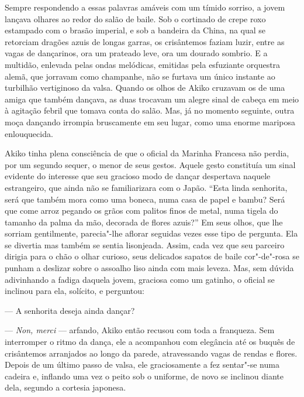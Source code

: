 Sempre respondendo a essas palavras amáveis com um tímido sorriso, a
jovem lançava olhares ao redor do salão de baile. Sob o cortinado de
crepe roxo estampado com o brasão imperial, e sob a bandeira da China,
na qual se retorciam dragões azuis de longas garras, os crisântemos
faziam luzir, entre as vagas de dançarinos, ora um prateado leve, ora
um dourado sombrio. E a multidão, enlevada pelas ondas melódicas,
emitidas pela esfuziante orquestra alemã, que jorravam como champanhe,
não se furtava um único instante ao turbilhão vertiginoso da valsa.
Quando os olhos de Akiko cruzavam os de uma amiga que também dançava,
as duas trocavam um alegre sinal de cabeça em meio à agitação febril
que tomava conta do salão. Mas, já no momento seguinte, outra moça
dançando irrompia bruscamente em seu lugar, como uma enorme mariposa
enlouquecida.

Akiko tinha plena consciência de que o oficial da Marinha Francesa não	
perdia, por um segundo sequer, o menor de seus gestos. Aquele gesto
constituía um sinal evidente do interesse que seu gracioso modo de
dançar despertava naquele estrangeiro, que ainda não se familiarizara
com o Japão. ``Esta linda senhorita, será que também mora como uma
boneca, numa casa de papel e bambu? Será que come arroz pegando os
grãos com palitos finos de metal, numa tigela do tamanho da palma da
mão, decorada de flores azuis?'' Em seus olhos, que lhe sorriam
gentilmente, parecia"-lhe aflorar seguidas vezes esse tipo de pergunta.
Ela se divertia mas também se sentia lisonjeada. Assim, cada vez que
seu parceiro dirigia para o chão o olhar curioso, seus delicados
sapatos de baile cor"-de"-rosa se punham a deslizar sobre o assoalho liso
ainda com mais leveza. Mas, sem dúvida adivinhando a fadiga daquela
jovem, graciosa como um gatinho, o oficial se inclinou para ela,
solícito, e perguntou:

--- A senhorita deseja ainda dançar?

--- \textit{Non, merci} --- arfando, Akiko então recusou com toda a
franqueza. Sem interromper o ritmo da dança, ele a acompanhou com
elegância até os buquês de crisântemos arranjados ao longo da parede,
atravessando vagas de rendas e flores. Depois de um último passo de
valsa, ele graciosamente a fez sentar"-se numa cadeira e, inflando uma
vez o peito sob o uniforme, de novo se inclinou diante dela, segundo a
cortesia japonesa.


